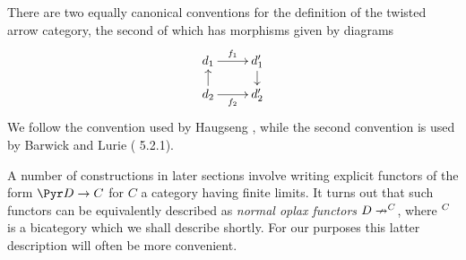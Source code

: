 \documentclass[a4paper]{article}
\numberwithin{equation}{section}
\begin{document}
\begin{remark}
 There are two equally canonical conventions for the definition of the twisted arrow category, the second of which has morphisms given by diagrams
 \begin{equation*}
 \xymatrixrowsep{.9pc} \xymatrix{d_1 \ar[r]^-{f_1}  & d_1' \ar[d] \\
 d_2 \ar[r]_-{f_2}\ar[u]  & d_2'  }
\end{equation*}
We follow the convention used by Haugseng \cite{RuneSpans}, while the second convention is used by Barwick \cite{BarwickSpan} and Lurie (\cite{LurieHA} 5.2.1).
\end{remark}



A number of constructions in later sections involve writing explicit functors of the form $\Pyr D \to C$ for $C$ a category having finite limits. It turns out that such functors can be equivalently described as {\em normal oplax functors} $D \nrightarrow \sp C$, where $\sp C$ is a bicategory which we shall describe shortly. For our purposes this latter description will often be more convenient.
\end{document}
